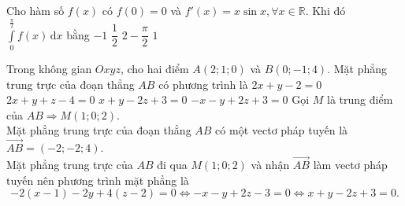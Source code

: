 \begin{ex}%
Cho hàm số $ f(x) $ có $ f(0)= 0 $ và  $ f'(x)=x\sin x, \forall x\in\mathbb{R} $. Khi đó $ \displaystyle\int\limits_0^{\frac{\pi}{2}} f(x)\mathrm{\,d}x $ bằng
\choice
{$ -1 $}
{$ \dfrac{1}{2} $}
{\True $ 2-\dfrac{\pi}{2} $}
{$ 1 $}
\end{ex}

\begin{ex}%
Trong không gian $Oxyz$, cho hai điểm $A(2;1;0)$ và $B(0;-1;4)$. Mặt phẳng trung trực của đoạn thẳng $AB$ có phương trình là
\choice
{$2x+y-2=0$}
{$2x+y+z-4=0$}
{\True $x+y-2z+3=0$}
{$-x-y+2z+3=0$}
\loigiai
{
Gọi $M$ là trung điểm của $AB\Rightarrow M(1;0;2)$.\\
Mặt phẳng trung trực của đoạn thẳng $AB$ có một vectơ pháp tuyến là $\overrightarrow{AB}=(-2;-2;4)$.\\
Mặt phẳng trung trực của $AB$ đi qua $M(1;0;2)$ và nhận $\overrightarrow{AB}$ làm vectơ pháp tuyến nên phương trình mặt phẳng là $$-2(x-1)-2y+4(z-2)=0\Leftrightarrow -x-y+2z-3=0\Leftrightarrow x+y-2z+3=0.$$
}
\end{ex}

